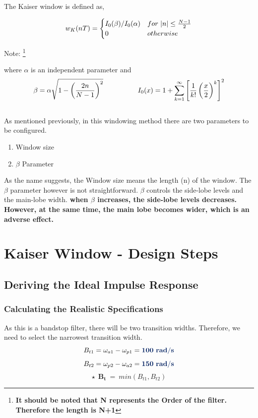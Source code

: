 \documentclass[11pt]{article}
\begin{document}
The Kaiser window is defined as,

\[
	w_K(nT) = \begin{cases}
	I_0(\beta)/I_0(\alpha) & for \hspace*{3pt} \abs{n}  \leq \frac{N-1}{2}  \\
	0 & otherwise 
	\end{cases}
\]

\begin{flushright}
	Note: \footnote{\bf It should be noted that N represents the Order of the filter. Therefore the length is N+1} 
\end{flushright}
where $\alpha$ is an independent parameter and\\
$$\beta = \alpha\sqrt{1-\left(\frac{2n}{N-1}\right)^2} \hspace*{50pt} I_0(x) = 1+\sum_{k=1}^{\infty}\left[\frac{1}{k!}\left(\frac{x}{2}\right)^k\right]^2$$\\

As mentioned previously, in this windowing method there are two parameters to be configured.

\begin{enumerate}
	\item Window size
	\item $\beta$ Parameter
\end{enumerate}

As the name suggests, the Window size means the length (n) of the window.
The $\beta$ parameter however is not straightforward. $\beta$ controls the side-lobe levels and the main-lobe width.\cite{kaiser_window_beta_parameter}
{\bf when $ \beta $ increases, the side-lobe levels decreases. However, at the same time, the main lobe becomes wider, which is an adverse effect. }

\clearpage
\section{Kaiser Window - Design Steps}


\subsection{Deriving the Ideal Impulse Response}
\subsubsection{Calculating the Realistic Specifications}
As this is a bandstop filter, there will be two transition widths. Therefore, we need to select the narrowest transition width.
$$B_{t1} =  \omega_{a1}-\omega_{p1} = \mathbf{\color{ultramarine}100 \ rad/s}$$ 
$$B_{t2} =  \omega_{p2}-\omega_{a2} = \mathbf{\color{ultramarine}150 \ rad/s}$$
$$ \star \ \  \mathbf{B_{t}} \ =\ min( B_{t1} ,B_{t2})$$
\end{document}
